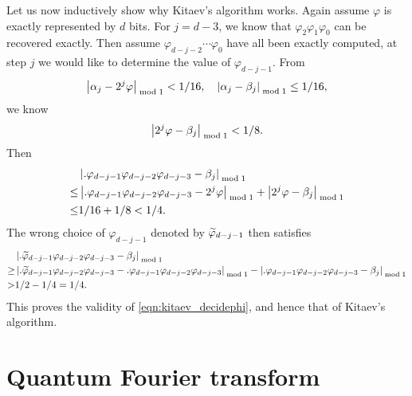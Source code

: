 Let us now  inductively show why Kitaev's algorithm works. Again assume $\varphi$ is exactly represented by $d$ bits. For $j=d-3$, we know that $\varphi_2\varphi_1\varphi_0$ can be recovered exactly. Then assume $\varphi_{d-j-2}\cdots\varphi_0$ have all been exactly computed, at step $j$ we would like to determine the value of $\varphi_{d-j-1}$. From
\begin{equation}
\left\lvert\alpha_j-2^j\varphi\right\rvert_{\bmod 1}<1/16, \quad \left\lvert\alpha_j-\beta_j\right\rvert_{\bmod 1}\le 1/16,
\end{equation}
we know
\begin{equation}
\left\lvert2^j\varphi-\beta_j\right\rvert_{\bmod 1}< 1/8.
\end{equation}
Then 
\begin{equation}
\begin{split}
 &\left\lvert.\varphi_{d-j-1}\varphi_{d-j-2}\varphi_{d-j-3}-\beta_j\right\rvert_{\bmod 1}\\
\le &
\left\lvert.\varphi_{d-j-1}\varphi_{d-j-2}\varphi_{d-j-3}-2^j\varphi\right\rvert_{\bmod 1}
+
\left\lvert2^j\varphi-\beta_j\right\rvert_{\bmod 1}\\
\le & 1/16+1/8<1/4.
\end{split}
\end{equation}
The wrong choice of $\varphi_{d-j-1}$ denoted by  $\widetilde{\varphi}_{d-j-1}$ then satisfies
\begin{equation}
\begin{split}
 &\left\lvert.\widetilde{\varphi}_{d-j-1}\varphi_{d-j-2}\varphi_{d-j-3}-\beta_j\right\rvert_{\bmod 1}\\
\ge &
\left\lvert.\widetilde{\varphi}_{d-j-1}\varphi_{d-j-2}\varphi_{d-j-3}-.\varphi_{d-j-1}\varphi_{d-j-2}\varphi_{d-j-3}\right\rvert_{\bmod 1}-
\left\lvert.\varphi_{d-j-1}\varphi_{d-j-2}\varphi_{d-j-3}-\beta_j\right\rvert_{\bmod 1}\\
> & 1/2-1/4=1/4.
\end{split}
\end{equation}
This proves the validity of \cref{eqn:kitaev_decidephi}, and hence that of Kitaev's algorithm.





\section{Quantum Fourier transform}

